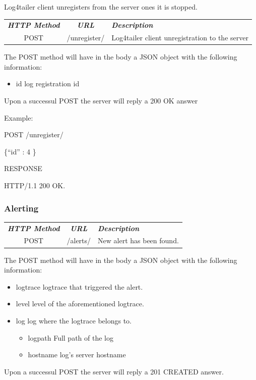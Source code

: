 Log4tailer client unregisters from the server ones it is stopped.

\begin{flushleft}
 \begin{tabular}{|c|c|l|}
 \hline 
 \rowcolor{cyan} {\color{white} \textit{\textbf{HTTP Method}}} &  {\color{white} 
  \textit{\textbf{URL}}}  & {\color{white} 
 \textit{\textbf{Description}}}\\
 POST & /unregister/ & Log4tailer client unregistration to the server\\
 \hline
\end{tabular}
\end{flushleft}
The POST method will have in the body a JSON object with the following
information:

\begin{itemize}
 \item id log registration id 
\end{itemize}

\noindent
Upon a successul POST the server will reply a 200 OK answer

\noindent
Example:

\begin{codeexample}

POST /unregister/

 \{``id'' : 4 \}

RESPONSE

HTTP/1.1 200 OK.
\end{codeexample}

\subsubsection{Alerting}

\begin{flushleft}
 \begin{tabular}{|c|c|l|}
 \hline 
 \rowcolor{cyan} {\color{white} \textit{\textbf{HTTP Method}}} &  {\color{white} 
  \textit{\textbf{URL}}}  & {\color{white} 
 \textit{\textbf{Description}}}\\
 POST & /alerts/ & New alert has been found.\\
 \hline
\end{tabular}
\end{flushleft}
The POST method will have in the body a JSON object with the following
information:

\begin{itemize}
 \item logtrace logtrace that triggered the alert.
 \item level level of the aforementioned logtrace.
 \item log log where the logtrace belongs to.
    \begin{itemize}
      \item logpath Full path of the log 
      \item hostname log's server hostname
    \end{itemize}
\end{itemize}
Upon a successul POST the server will reply a 201 CREATED answer.

